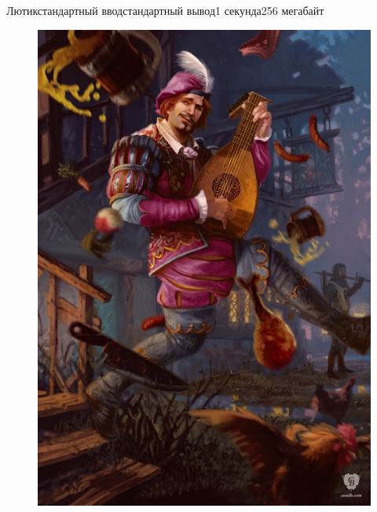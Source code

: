 \begin{problem}{Лютик}{стандартный ввод}{стандартный вывод}{1 секунда}{256 мегабайт}

\begin{figure}[h]
\hspace*{\fill}
\includegraphics[width=\linewidth,natwidth=350,natheight=499]{L.jpg}
\hspace*{\fill}
\end{figure}


\end{problem}
